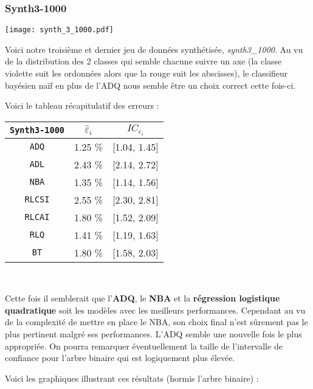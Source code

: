 \documentclass{article}
\begin{document}
\begin{multicols}{2}
\subsubsection{Synth3-1000}
\label{subsubsec_Synth3_1000}

\begingroup
   \centering
   \texttt{[image: synth\_3\_1000.pdf]}
    \label{fig_synth_3_1000}
\endgroup

Voici notre troisième et dernier jeu de données synthétisée, \textit{synth3\_1000}. Au vu de la distribution des 2 classes qui semble chacune suivre un axe (la classe violette suit les ordonnées alors que la rouge suit les abscisses), le classifieur bayésien naïf en plus de l'ADQ nous semble être un choix correct cette fois-ci.

Voici le tableau récapitulatif des erreurs :
\begin{center}
\begin{tabular}{| c || c | c |}
\hline
\texttt{Synth3-1000} & $\widehat{\varepsilon}_i$  & $IC_{\varepsilon_{i}}$  \\
\hline
\hline
\texttt{ADQ} & 1.25 \% & [1.04, 1.45] \\
\hline
\texttt{ADL} & 2.43 \% & [2.14, 2.72] \\
\hline
\texttt{NBA} & 1.35 \% & [1.14, 1.56] \\
\hline
\texttt{RLCSI} & 2.55 \% & [2.30, 2.81] \\
\hline
\texttt{RLCAI} & 1.80 \% & [1.52, 2.09] \\
\hline
\texttt{RLQ} &  1.41 \% & [1.19, 1.63] \\
\hline
\texttt{BT} & 1.80 \% & [1.58, 2.03] \\
\hline
\end{tabular}\\ 
\label{able_Synth3-1000}
\end{center}
Cette fois il semblerait que l'\textbf{ADQ}, le \textbf{NBA} et la \textbf{régression logistique quadratique} soit les modèles avec les meilleurs performances. Cependant au vu de la complexité de mettre en place le NBA, son choix final n'est sûrement pas le plus pertinent malgré ses performances. L'ADQ semble une nouvelle fois le plus appropriée.
On pourra remarquer éventuellement la taille de l'intervalle de confiance pour l'arbre binaire qui est logiquement plus élevée.

Voici les graphiques illustrant ces résultats (hormis l'arbre binaire) :


\end{multicols}
\end{document}
